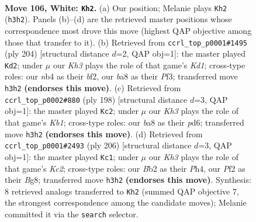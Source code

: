 \documentclass[11pt]{article}
\begin{document}
\clearpage

\begin{figure}[p]\centering
\begin{subfigure}{0.46\textwidth}\centering
\resizebox{\linewidth}{!}{%
\newchessgame
\chessboard[
  setfen={b7/8/7k/8/1n6/7K/1B3P2/8 w - - 57 106},
  showmover=false,
  pgfstyle=straightmove, color=movearrow, markmove={h3-h2}
]}
\caption{}
\end{subfigure}\hfill
\begin{subfigure}{0.46\textwidth}\centering
\resizebox{\linewidth}{!}{%
\newchessgame
\chessboard[
  setfen={4k3/8/8/4p3/8/5P2/B4b2/3K4 w - - 27 103},
  showmover=false,
  pgfstyle=straightmove, color=movearrow, markmove={d1-d2}
]}
\caption{}
\end{subfigure}
\\[4pt]
\begin{subfigure}{0.46\textwidth}\centering
\resizebox{\linewidth}{!}{%
\newchessgame
\chessboard[
  setfen={8/3B4/3p2n1/3P4/1k6/8/8/1K6 w - - 13 100},
  showmover=false,
  pgfstyle=straightmove, color=movearrow, markmove={b1-c2}
]}
\caption{}
\end{subfigure}\hfill
\begin{subfigure}{0.46\textwidth}\centering
\resizebox{\linewidth}{!}{%
\newchessgame
\chessboard[
  setfen={6B1/8/8/7b/5k1P/8/2K5/8 w - - 11 104},
  showmover=false,
  pgfstyle=straightmove, color=movearrow, markmove={c2-c1}
]}
\caption{}
\end{subfigure}
\caption{\textbf{Move 106, White: \texttt{Kh2}.} (a) Our position; Melanie plays \texttt{Kh2} (\texttt{h3h2}). Panels (b)--(d) are the retrieved master positions whose correspondence most drove this move (highest QAP objective among those that transfer to it). (b) Retrieved from \texttt{ccrl\_top\_p0001\#1495} (ply 204) [structural distance $d$=2, QAP obj=1]: the master played \texttt{Kd2}; under $\mu$ our \emph{Kh3} plays the role of that game's \emph{Kd1}; cross-type roles: our \emph{n}b4 as their \emph{b}f2, our \emph{b}a8 as their \emph{P}f3; transferred move \texttt{h3h2} \textbf{(endorses this move)}. (c) Retrieved from \texttt{ccrl\_top\_p0002\#880} (ply 198) [structural distance $d$=3, QAP obj=1]: the master played \texttt{Kc2}; under $\mu$ our \emph{Kh3} plays the role of that game's \emph{Kb1}; cross-type roles: our \emph{b}a8 as their \emph{p}d6; transferred move \texttt{h3h2} \textbf{(endorses this move)}. (d) Retrieved from \texttt{ccrl\_top\_p0001\#2493} (ply 206) [structural distance $d$=3, QAP obj=1]: the master played \texttt{Kc1}; under $\mu$ our \emph{Kh3} plays the role of that game's \emph{Kc2}; cross-type roles: our \emph{B}b2 as their \emph{P}h4, our \emph{P}f2 as their \emph{B}g8; transferred move \texttt{h3h2} \textbf{(endorses this move)}. Synthesis: 8 retrieved analogs transferred to \texttt{Kh2} (summed QAP objective 7, the strongest correspondence among the candidate moves); Melanie committed it via the \texttt{search} selector.}
\label{fig:thought-m210}
\end{figure}
\end{document}
